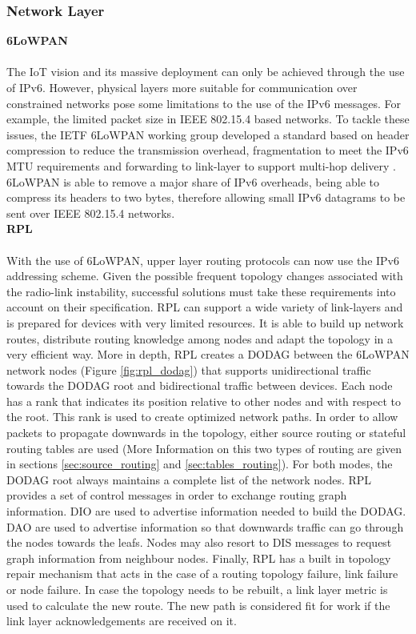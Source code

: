 \documentclass{sig-alternate-05-2015}
\begin{document}
\subsubsection{Network Layer}
\label{sec:network_layer}
\medskip
\textbf{6LoWPAN}\\\\
	The \gls{IoT} vision and its massive deployment can only be achieved through the use of IPv6. However, physical layers more suitable for communication over constrained networks pose some limitations to the use of the IPv6 messages. For example, the limited packet size in IEEE 802.15.4 based networks. To tackle these issues, the \gls{IETF} \gls{6LoWPAN} \cite{Shelby2012} working group developed a standard based on header compression to reduce the transmission overhead, fragmentation to meet the IPv6 \gls{MTU} requirements and forwarding to link-layer to support multi-hop delivery \cite{Hui2008}.
	\gls{6LoWPAN} is able to remove a major share of IPv6 overheads, being able to compress its headers to two bytes, therefore allowing small IPv6 datagrams to be sent over IEEE 802.15.4 networks. \\
	
\textbf{RPL}\\\\
With the use of 6LoWPAN, upper layer routing protocols can now use the IPv6 addressing scheme. Given the possible frequent topology changes associated with the radio-link instability, successful  solutions must take these requirements into account on their specification. \gls{RPL} \cite{Winter2012} can support a wide variety of link-layers and is prepared for devices with very limited resources. It is able to build up network routes, distribute routing knowledge among nodes and adapt the topology in a very efficient way. More in depth, \gls{RPL} creates a \gls{DODAG} between the 6LoWPAN network nodes (Figure \ref{fig:rpl_dodag}) that supports unidirectional traffic towards the \gls{DODAG} root and bidirectional traffic between devices. Each node has a rank that indicates its position relative to other nodes and with respect to the root. This rank is used to create optimized network paths. In order to allow packets to propagate downwards in the topology, either source routing or stateful routing tables are used (More Information on this two types of routing are given in sections \ref{sec:source_routing} and \ref{sec:tables_routing}). For both modes, the \gls{DODAG} root always maintains a complete list of the network nodes. \gls{RPL} provides a set of control messages in order to exchange routing graph information. \gls{DIO} are used to advertise information needed to build the \gls{DODAG}. \gls{DAO}  are used to advertise information so that downwards traffic can go through the nodes towards the leafs. Nodes may also resort to \gls{DIS} messages to request graph information from neighbour nodes. Finally, RPL has a built in topology repair mechanism that acts in the case of a routing topology failure, link failure or node failure. In case the topology needs to be rebuilt, a link layer metric is used to calculate the new route. The new path is considered fit for work if the link layer acknowledgements are received on it.
\end{document}
